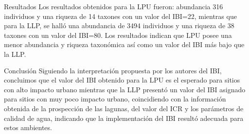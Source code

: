 \documentclass[final]{beamer}
\newlength{\onecolwid}
\begin{document}
\begin{frame}[t]
\begin{columns}[t]
\begin{column}{\onecolwid}
          
          
          \begin{block}{Resultados}
         Los resultados obtenidos para la LPU fueron: abundancia 316 individuos y una riqueza de 14 taxones con un valor del IBI=22, mientras que para la LLP, se halló una abundancia de 3494 individuos y una riqueza de 38 taxones con un valor del IBI=80. Los resultados indican que  LPU posee una menor abundancia y riqueza taxonómica así como un valor del IBI más bajo que la LLP. 
         
         
         
         
         
         
         
         
         
         
         
         
         
         
         
         

          \end{block}
          
          
          \begin{block}{Conclusión}
          Siguiendo la interpretación propuesta por los autores del IBI, concluimos que el valor del IBI obtenido para la LPU es el esperado para sitios con alto impacto urbano mientras que la LLP presentó un valor del IBI asignado para sitios con muy poco impacto urbano, coincidiendo con la información obtenida de la prospección de las lagunas, del valor del ICR y los parámetros de calidad de agua, indicando que  la implementación del IBI resultó adecuada para estos ambientes. 
          \end{block}
          

\end{column}
\end{columns}
\end{frame}
\end{document}
